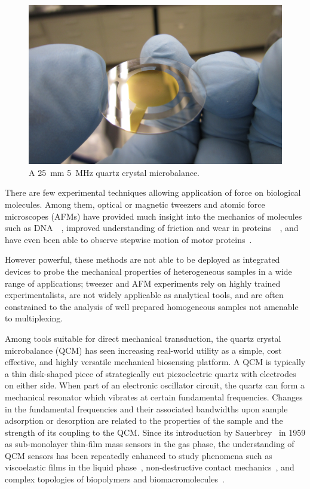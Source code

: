 \begin{figure}[ht]
 \centering
 \includegraphics[keepaspectratio,width=12cm]{qcm/figures/qcm_holding.jpg}
 \caption{A \SI{25}{\milli\meter} \SI{5}{\mega\hertz} quartz crystal microbalance.}
 \label{fig:qcmholding}
\end{figure}
There are few experimental techniques allowing application of force
on biological molecules. Among them, optical or magnetic tweezers and
atomic force microscopes (AFMs) have provided much insight into the
mechanics of molecules such as
DNA~\cite{cui2000pulling}~\cite{marko1995stretching}, improved
understanding of friction and wear in
proteins~\cite{suda2001origin}~\cite{bormuth2009protein}, and have even
been able to observe stepwise motion of motor
proteins~\cite{asbury2003kinesin}.

However powerful, these methods are not able to be deployed as integrated
devices to probe the mechanical properties of heterogeneous samples in a
wide range of applications; tweezer and AFM experiments rely on highly
trained experimentalists, are not widely applicable as analytical tools,
and are often constrained to the analysis of well prepared homogeneous
samples not amenable to multiplexing.

Among tools suitable for direct mechanical transduction, the quartz crystal
microbalance (QCM) has seen increasing real-world utility as a simple, cost
effective, and highly versatile mechanical biosensing platform. A QCM is
typically a thin disk-shaped piece of strategically cut piezoelectric
quartz with electrodes on either side. When part of an electronic
oscillator circuit, the quartz can form a mechanical resonator which
vibrates at certain fundamental frequencies. Changes in the fundamental
frequencies and their associated bandwidths upon sample adsorption or
desorption are related to the properties of the sample and the strength of
its coupling to the QCM. Since its introduction by
Sauerbrey~\cite{sauerbrey1959verwendung} in 1959 as sub-monolayer thin-film
mass sensors in the gas phase, the understanding of QCM sensors has been
repeatedly enhanced to study phenomena such as viscoelastic films in the
liquid phase~\cite{kanazawa1985frequency}, non-destructive contact
mechanics~\cite{johannsman2007contacts}, and complex topologies of
biopolymers and biomacromolecules~\cite{marx2003quartz}. 

